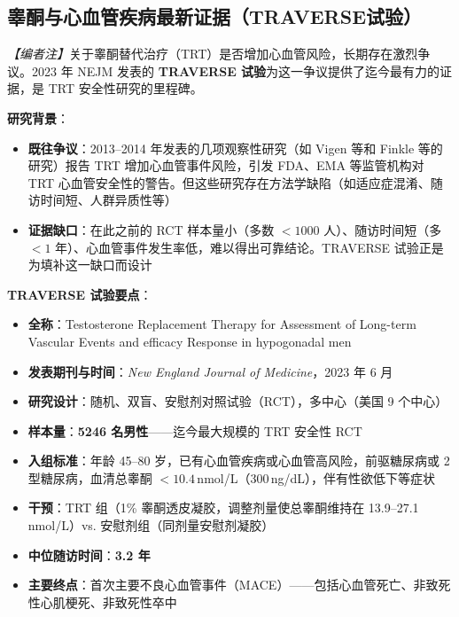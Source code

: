 \begin{enumerate}
\subsection{睾酮与心血管疾病最新证据（TRAVERSE试验）}
\label{subsec:traverse_trial}

\noindent\textit{【编者注】}关于睾酮替代治疗（TRT）是否增加心血管风险，长期存在激烈争议。2023 年 NEJM 发表的 \textbf{TRAVERSE 试验}为这一争议提供了迄今最有力的证据，是 TRT 安全性研究的里程碑。

\vspace{0.5em}
\noindent\textbf{研究背景}：

\begin{itemize}[leftmargin=2cm]
	\item \textbf{既往争议}：2013--2014 年发表的几项观察性研究（如 Vigen 等和 Finkle 等的研究）报告 TRT 增加心血管事件风险，引发 FDA、EMA 等监管机构对 TRT 心血管安全性的警告。但这些研究存在方法学缺陷（如适应症混淆、随访时间短、人群异质性等）
	\item \textbf{证据缺口}：在此之前的 RCT 样本量小（多数 $<1000$ 人）、随访时间短（多 $<1$ 年）、心血管事件发生率低，难以得出可靠结论。TRAVERSE 试验正是为填补这一缺口而设计
\end{itemize}

\vspace{0.5em}
\noindent\textbf{TRAVERSE 试验要点}：

\begin{itemize}[leftmargin=2cm]
	\item \textbf{全称}：Testosterone Replacement Therapy for Assessment of Long-term Vascular Events and efficacy Response in hypogonadal men
	\item \textbf{发表期刊与时间}：\textit{New England Journal of Medicine}，2023 年 6 月
	\item \textbf{研究设计}：随机、双盲、安慰剂对照试验（RCT），多中心（美国 9 个中心）
	\item \textbf{样本量}：\textbf{5246 名男性}——迄今最大规模的 TRT 安全性 RCT
	\item \textbf{入组标准}：年龄 45--80 岁，已有心血管疾病或心血管高风险，前驱糖尿病或 2 型糖尿病，血清总睾酮 $<10.4\,$nmol/L（300\,ng/dL），伴有性欲低下等症状
	\item \textbf{干预}：TRT 组（1\% 睾酮透皮凝胶，调整剂量使总睾酮维持在 13.9--27.1\,nmol/L）vs. 安慰剂组（同剂量安慰剂凝胶）
	\item \textbf{中位随访时间}：\textbf{3.2 年}
	\item \textbf{主要终点}：首次主要不良心血管事件（MACE）——包括心血管死亡、非致死性心肌梗死、非致死性卒中
\end{itemize}


\end{enumerate}
